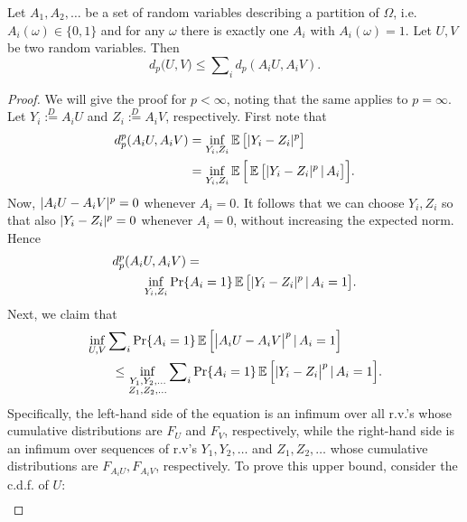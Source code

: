 \documentclass{article}
\def \Ddef {\overset{D}{:=}}
\begin{document}
\begin{lem}
Let $A_1, A_2, \dots$ be a set of random variables describing a partition of $\Omega$, i.e. $A_i(\omega) \in \{0, 1\}$ and for any $\omega$ there is exactly one $A_i$ with $A_i(\omega) = 1$. Let $U, V$ be two random variables. Then
\begin{equation*}
d_p\big (U, V \big) \le \sum\nolimits_i d_p (A_i U, A_i V) .
\end{equation*}
\end{lem}
\begin{proof}
%
%
%
%
%
%
We will give the proof for $p < \infty$, noting that the same applies to $p = \infty$. 
Let $Y_i \Ddef A_i U$ and $Z_i \Ddef A_i V$, respectively. First note that
\begin{align}
d^p_p(A_i U, A_i V) &= \inf_{Y_i, Z_i} \expect \big [ \panorm{Y_i - Z_i} \big ] \nonumber \\
&= \inf_{Y_i, Z_i} \expect \Big [ \expect \big [ \panorm{Y_i - Z_i} \cbar A_i \big ] \Big ] \nonumber .
\end{align}
Now, $| A_i U - A_i V |^p = 0$ whenever $A_i = 0$. It follows that we can choose $Y_i, Z_i$ so that also $| Y_i - Z_i |^p = 0$ whenever $A_i = 0$, without increasing the expected norm. Hence
\begin{align}
d^p_p(A_i U, A_i V) &= \nonumber \\
&\hspace{-3.5em}\inf_{Y_i, Z_i} \Pr\{A_i = 1\} \expect \big [ \panorm{Y_i - Z_i} \cbar A_i = 1 \big ]. \label{eqn:norm_dp_ai}
\end{align}
Next, we claim that
\begin{align}
& \inf_{U, V} \sum\nolimits_i \Pr\{A_i = 1\} \expect \Big [ \big | A_i U - A_i V \big |^p \cbar A_i = 1 \Big ] \label{eqn:infimum_bound} \\
&\hspace{2em} \le \inf_{\substack{Y_1, Y_2, \dots\\Z_1, Z_2, \dots}} \sum\nolimits_i \Pr\{A_i = 1\} \expect \Big [ | Y_i - Z_i \big |^p \cbar A_i = 1 \Big ] . \nonumber
\end{align}
Specifically, the left-hand side of the equation is an infimum over all r.v.'s whose cumulative distributions are $F_U$ and $F_V$, respectively, while the right-hand side is an infimum over sequences of r.v's $Y_1, Y_2, \dots$ and $Z_1, Z_2, \dots$ whose cumulative distributions are $F_{A_i U}, F_{A_i V}$, respectively.
To prove this upper bound, consider the c.d.f. of $U$:
\begin{align*}

\end{align*}
\end{proof}
\end{document}

